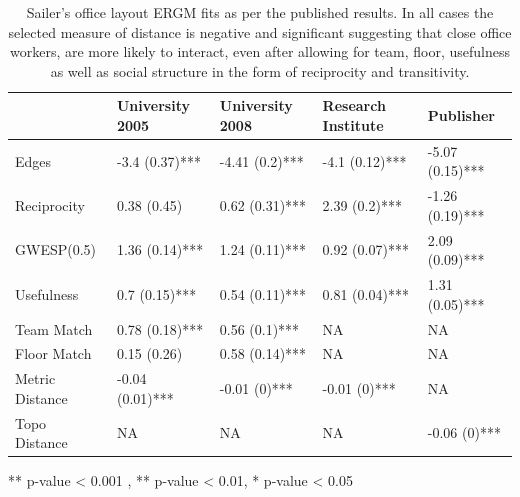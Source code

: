 \documentclass[
]{statsoc}
\begin{document}
\begin{table}

\caption{\label{tab:unnamed-chunk-2}\label{tab:sailer_ergm_pub} Sailer's office layout ERGM fits as per the published results. In all cases the selected measure of distance is negative and significant suggesting that close office workers, are more likely to interact, even after allowing for team, floor, usefulness as well as social structure in the form of reciprocity and transitivity.}
\centering
\begin{threeparttable}
\begin{tabular}[t]{lllll}
\toprule
  & University 2005 & University 2008 & Research Institute & Publisher\\
\midrule
\rowcolor{gray!6}  Edges & -3.4 (0.37)*** & -4.41 (0.2)*** & -4.1 (0.12)*** & -5.07 (0.15)***\\
Reciprocity & 0.38 (0.45) & 0.62 (0.31)*** & 2.39 (0.2)*** & -1.26 (0.19)***\\
\rowcolor{gray!6}  GWESP(0.5) & 1.36 (0.14)*** & 1.24 (0.11)*** & 0.92 (0.07)*** & 2.09 (0.09)***\\
Usefulness & 0.7 (0.15)*** & 0.54 (0.11)*** & 0.81 (0.04)*** & 1.31 (0.05)***\\
\rowcolor{gray!6}  Team Match & 0.78 (0.18)*** & 0.56 (0.1)*** & NA & NA\\
\addlinespace
Floor Match & 0.15 (0.26) & 0.58 (0.14)*** & NA & NA\\
\rowcolor{gray!6}  Metric Distance & -0.04 (0.01)*** & -0.01 (0)*** & -0.01 (0)*** & NA\\
Topo Distance & NA & NA & NA & -0.06 (0)***\\
\bottomrule
\end{tabular}
\begin{tablenotes}
\item *** p-value < 0.001 , ** p-value < 0.01, * p-value < 0.05
\end{tablenotes}
\end{threeparttable}
\end{table}
\end{document}
